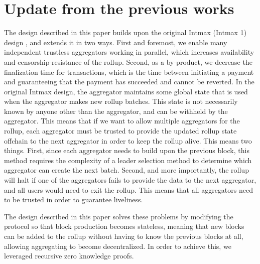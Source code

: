 \section{Update from the previous works}
\begin{previousworks}

The design described in this paper builds upon the original Intmax (Intmax 1) design \cite{intmax}, and extends it in two ways. First and foremost, we enable many independent trustless aggregators working in parallel, which increases availability and censorship-resistance of the rollup. Second, as a by-product, we decrease the finalization time for transactions, which is the time between initiating a payment and guaranteeing that the payment has succeeded and cannot be reverted.
In the original Intmax design, the aggregator maintains some global state that is used when the aggregator makes new rollup batches. This state is not
necessarily known by anyone other than the aggregator, and can be withheld by the aggregator. This means that if we want to allow multiple aggregators
for the rollup, each aggregator must be trusted to
provide the updated rollup state offchain to the next
aggregator in order to keep the rollup alive. This
means two things. First, since each aggregator needs
to build upon the previous block, this method requires the complexity of a leader selection method to determine which aggregator can create the next
batch. Second, and more importantly, the rollup will halt if one of the aggregators fails to provide the data to the next aggregator, and all users would need to exit the rollup. This means that all aggregators need
to be trusted in order to guarantee liveliness.

The design described in this paper solves these problems by modifying the protocol so that block production becomes stateless, meaning that new blocks can be added to the rollup without having to know the previous blocks at all, allowing aggregating to become decentralized. In order to achieve this, we
leveraged recursive zero knowledge proofs.



\end{previousworks}